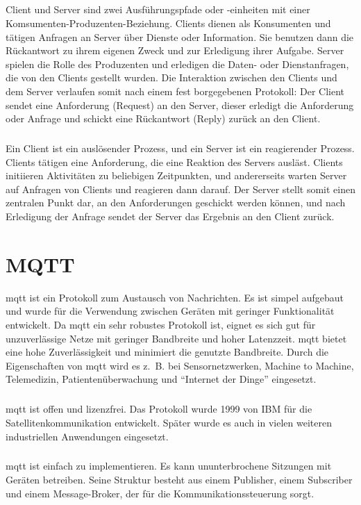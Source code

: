 \subparagraph{} 
Client und Server sind zwei Ausführungspfade oder -einheiten mit einer
Komsumenten-Produzenten-Beziehung. Clients dienen als Konsumenten und tätigen
Anfragen an Server über Dienste oder Information. Sie benutzen dann die
Rückantwort zu ihrem eigenen Zweck und zur Erledigung ihrer Aufgabe. Server
spielen die Rolle des Produzenten und erledigen die Daten- oder Dienstanfragen,
die von den Clients gestellt wurden. Die Interaktion zwischen den Clients und
dem Server verlaufen somit nach einem fest borgegebenen Protokoll: Der Client
sendet eine Anforderung (Request) an den Server, dieser erledigt die Anforderung
oder Anfrage und schickt eine Rückantwort (Reply) zurück an den Client.

\subparagraph{}
Ein Client ist ein auslösender Prozess, und ein Server ist ein reagierender
Prozess. Clients tätigen eine Anforderung, die eine Reaktion des Servers
ausläst. Clients initiieren Aktivitäten zu beliebigen Zeitpunkten, und
andererseits warten Server auf Anfragen von Clients und reagieren dann darauf.
Der Server stellt somit einen zentralen Punkt dar, an den Anforderungen
geschickt werden können, und nach Erledigung der Anfrage sendet der Server das
Ergebnis an den Client zurück.
\cite{Bengel2015}

\section{MQTT}\label{sec:mqtt}
\ac{mqtt} ist ein Protokoll zum Austausch von Nachrichten. Es ist simpel
aufgebaut und wurde für die Verwendung zwischen Geräten mit geringer
Funktionalität entwickelt. Da \ac{mqtt} ein sehr robustes Protokoll ist, eignet
es sich gut für unzuverlässige Netze mit geringer Bandbreite und hoher
Latenzzeit. \ac{mqtt} bietet eine hohe Zuverlässigkeit und minimiert die
genutzte Bandbreite. Durch die Eigenschaften von \ac{mqtt} wird es z.~B. bei
Sensornetzwerken, Machine to Machine, Telemedizin, Patientenüberwachung und
"`Internet der Dinge"' eingesetzt.

\subparagraph{}
\ac{mqtt} ist offen und lizenzfrei. Das Protokoll wurde 1999 von IBM für die
Satellitenkommunikation entwickelt. Später wurde es auch in vielen weiteren
industriellen Anwendungen eingesetzt.

\subparagraph{}
\ac{mqtt} ist einfach zu implementieren. Es kann ununterbrochene Sitzungen mit
Geräten betreiben. Seine Struktur besteht aus einem Publisher, einem Subscriber
und einem Message-Broker, der für die Kommunikationssteuerung sorgt.
\cite{dennisseidel2018}
